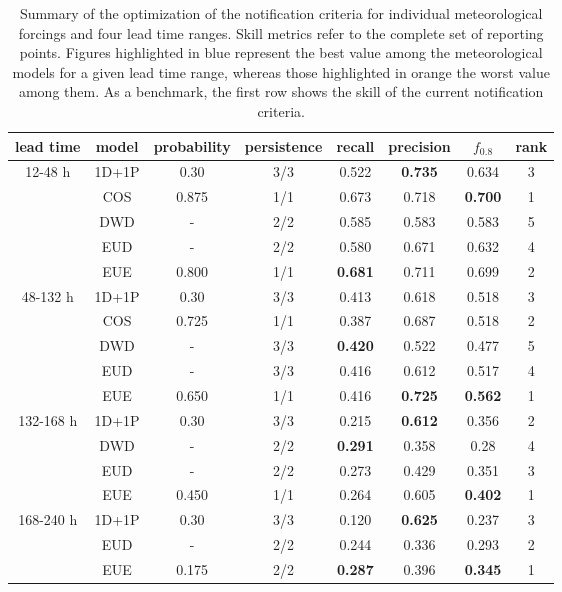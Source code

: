 \documentclass[preprint,12pt]{elsarticle}
\begin{document}
\begin{table}
    \centering
    \begin{tabular}{cccccccc}
        \hline
        lead time & model & probability & persistence & recall & precision & $f_{0.8}$ & rank \\
        \hline
        12-48 h & 1D+1P & 0.30 & 3/3 & 0.522 & \textbf{0.735} & 0.634 & 3 \\
         & COS & 0.875 & 1/1 & 0.673 & 0.718 & \textbf{0.700} & 1 \\
         & DWD & - & 2/2 & 0.585 & 0.583 & 0.583 & 5 \\
         & EUD & - & 2/2 & 0.580 & 0.671 & 0.632 & 4 \\
         & EUE & 0.800 & 1/1 & \textbf{0.681} & 0.711 & 0.699 & 2 \\
         \hline
        48-132 h & 1D+1P & 0.30 & 3/3 & 0.413 & 0.618 & 0.518 & 3 \\
         & COS & 0.725 & 1/1 & 0.387 & 0.687 & 0.518 & 2 \\
         & DWD & - & 3/3 & \textbf{0.420} & 0.522 & 0.477 & 5 \\
         & EUD & - & 3/3 & 0.416 & 0.612 & 0.517 & 4 \\
         & EUE & 0.650 & 1/1 & 0.416 & \textbf{0.725} & \textbf{0.562} & 1 \\
         \hline
        132-168 h & 1D+1P & 0.30 & 3/3 & 0.215 & \textbf{0.612} & 0.356 & 2 \\
         & DWD & - & 2/2 & \textbf{0.291} & 0.358 & 0.28 & 4 \\
         & EUD & - & 2/2 & 0.273 & 0.429 & 0.351 & 3 \\
         & EUE & 0.450 & 1/1 & 0.264 & 0.605 & \textbf{0.402} & 1 \\
         \hline
        168-240 h & 1D+1P & 0.30 & 3/3 & 0.120 & \textbf{0.625} & 0.237 & 3 \\
         & EUD & - & 2/2 & 0.244 & 0.336 & 0.293 & 2 \\
         & EUE & 0.175 & 2/2 & \textbf{0.287} & 0.396 & \textbf{0.345} & 1 \\
         \hline
    \end{tabular}
    \caption{Summary of the optimization of the notification criteria for individual meteorological forcings and four lead time ranges. Skill metrics refer to the complete set of reporting points. Figures highlighted in blue represent the best value among the meteorological models for a given lead time range, whereas those highlighted in orange the worst value among them. As a benchmark, the first row shows the skill of the current notification criteria.}
    \label{tab:NWP_optimization}
\end{table}
\end{document}
